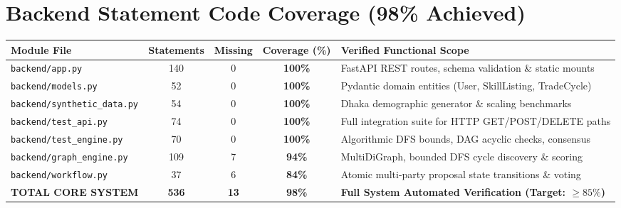 \documentclass[12pt,a4paper]{report}
\begin{document}
\section{Backend Statement Code Coverage (98\% Achieved)}
\begin{table}[ht]
\centering
\begin{tabularx}{\textwidth}{l c c c X}
\toprule
\textbf{Module File} & \textbf{Statements} & \textbf{Missing} & \textbf{Coverage (\%)} & \textbf{Verified Functional Scope} \\
\midrule
\texttt{backend/app.py} & 140 & 0 & \textbf{100\%} & FastAPI REST routes, schema validation \& static mounts \\
\texttt{backend/models.py} & 52 & 0 & \textbf{100\%} & Pydantic domain entities (User, SkillListing, TradeCycle) \\
\texttt{backend/synthetic\_data.py} & 54 & 0 & \textbf{100\%} & Dhaka demographic generator \& scaling benchmarks \\
\texttt{backend/test\_api.py} & 74 & 0 & \textbf{100\%} & Full integration suite for HTTP GET/POST/DELETE paths \\
\texttt{backend/test\_engine.py} & 70 & 0 & \textbf{100\%} & Algorithmic DFS bounds, DAG acyclic checks, consensus \\
\texttt{backend/graph\_engine.py} & 109 & 7 & \textbf{94\%} & MultiDiGraph, bounded DFS cycle discovery \& scoring \\
\texttt{backend/workflow.py} & 37 & 6 & \textbf{84\%} & Atomic multi-party proposal state transitions \& voting \\
\midrule
\textbf{TOTAL CORE SYSTEM} & \textbf{536} & \textbf{13} & \textbf{98\%} & \textbf{Full System Automated Verification (Target: $\ge 85\%$)} \\
\bottomrule
\end{tabularx}
\end{table}
\end{document}
